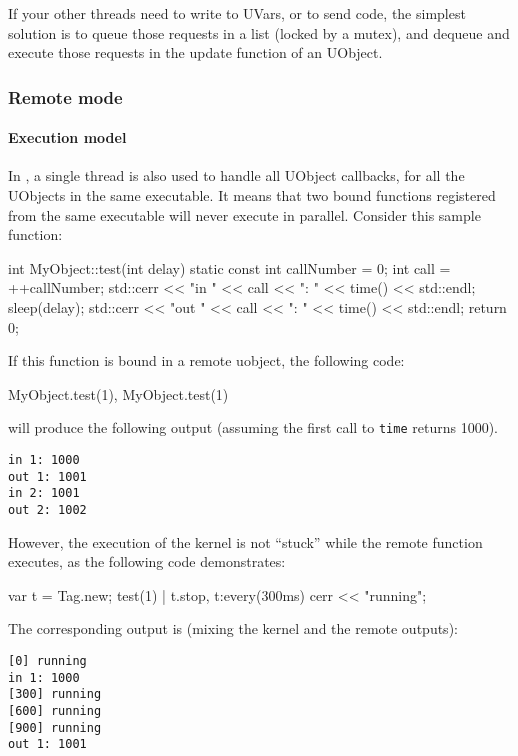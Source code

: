 If your other threads need to write to UVars, or to send \us code, the
simplest solution is to queue those requests in a list (locked by a
mutex), and dequeue and execute those requests in the update function
of an UObject.

\subsubsection{Remote mode}

\paragraph{Execution model}

In , a single thread is also used to handle all
UObject callbacks, for all the UObjects in the same executable. It
means that two bound functions registered from the same executable
will never execute in parallel. Consider this sample \Cxx function:

\begin{cxx}
int MyObject::test(int delay)
{
  static const int callNumber = 0;
  int call = ++callNumber;
  std::cerr << "in "  << call << ": " << time() << std::endl;
  sleep(delay);
  std::cerr << "out " << call << ": " << time() << std::endl;
  return 0;
}
\end{cxx}

If this function is bound in a remote uobject, the following code:

\begin{cxx}
MyObject.test(1), MyObject.test(1)
\end{cxx}

\noindent
will produce the following output (assuming the first call to
\lstinline|time| returns 1000).

\begin{lstlisting}
in 1: 1000
out 1: 1001
in 2: 1001
out 2: 1002
\end{lstlisting}

However, the execution of the \urbi kernel is not ``stuck'' while the
remote function executes, as the following code demonstrates:

\begin{urbiunchecked}
var t = Tag.new;
test(1) | t.stop,
t:every(300ms)
  cerr << "running";
\end{urbiunchecked}

The corresponding output is (mixing the kernel and the remote outputs):

\begin{lstlisting}
[0] running
in 1: 1000
[300] running
[600] running
[900] running
out 1: 1001
\end{lstlisting}

